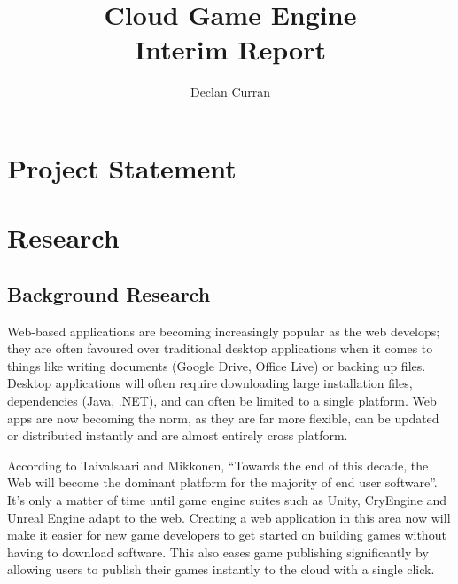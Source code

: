 \documentclass[a4paper, 12pt]{article}
\begin{document}
\title{
	{Cloud Game Engine}\\
	\large{Interim Report}\\
}
\author{Declan Curran}
\maketitle
\newpage

\setcounter{tocdepth}{3}
\tableofcontents
\newpage

\section{Project Statement}
\section{Research}
\subsection{Background Research}

Web-based applications are becoming increasingly popular as the web develops; they are often favoured over traditional desktop applications when it comes to things like writing documents (Google Drive, Office Live) or backing up files.\cite{6068340} Desktop applications will often require downloading large installation files, dependencies (Java, .NET), and can often be limited to a single platform. Web apps are now becoming the norm, as they are far more flexible, can be updated or distributed instantly and are almost entirely cross platform.\cite{5936687}

According to Taivalsaari and Mikkonen, ``Towards the end of this decade, the Web will become the dominant platform for the majority of 
end user software''.\cite{6068340} It's only a matter of time until game engine suites such as Unity\cite{unity}, CryEngine\cite{cryengine} and Unreal Engine\cite{unreal} adapt to the web. Creating a web application in this area now will make it easier for new game developers to get started on building games without having to download software. This also eases game publishing significantly by allowing users to publish their games instantly to the cloud with a single click.
\end{document}
